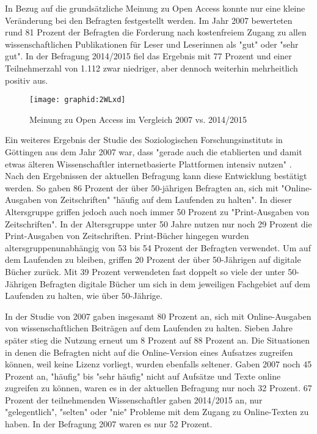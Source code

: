 In Bezug auf die grundsätzliche Meinung zu Open Access konnte nur eine kleine Veränderung bei den Befragten festgestellt werden. Im Jahr 2007 bewerteten rund 81 Prozent der Befragten die Forderung nach kostenfreiem Zugang zu allen wissenschaftlichen Publikationen für Leser und Leserinnen als "gut" oder "sehr gut". In der Befragung 2014/2015 fiel das Ergebnis mit 77 Prozent und einer Teilnehmerzahl von 1.112 zwar niedriger, aber dennoch weiterhin mehrheitlich positiv aus.

\begin{figure}[h!]
\texttt{[image: graphid:2WLxd]}
\caption{Meinung zu Open Access im Vergleich 2007 vs. 2014/2015}
\end{figure}

Ein weiteres Ergebnis der Studie des Soziologischen Forschungsinstituts in Göttingen aus dem Jahr 2007 war, dass "gerade auch die etablierten und damit etwas älteren Wissenschaftler internetbasierte Plattformen intensiv nutzen" \cite{Hanekop_2007}. Nach den Ergebnissen der aktuellen Befragung kann diese Entwicklung bestätigt werden. So gaben 86 Prozent der über 50-jährigen Befragten an, sich mit "Online-Ausgaben von Zeitschriften" "häufig auf dem Laufenden zu halten". In dieser Altersgruppe griffen jedoch auch noch immer 50 Prozent zu "Print-Ausgaben von Zeitschriften". In der Altersgruppe unter 50 Jahre nutzen nur noch 29 Prozent die Print-Ausgaben von Zeitschriften. Print-Bücher hingegen wurden altersgruppenunabhängig von 53 bis 54 Prozent der Befragten verwendet. Um auf dem Laufenden zu bleiben, griffen 20 Prozent der über 50-Jährigen auf digitale Bücher zurück. Mit 39 Prozent verwendeten fast doppelt so viele der unter 50-Jährigen Befragten digitale Bücher um sich in dem jeweiligen Fachgebiet auf dem Laufenden zu halten, wie über 50-Jährige.

In der Studie von 2007 gaben insgesamt 80 Prozent an, sich mit Online-Ausgaben von wissenschaftlichen Beiträgen auf dem Laufenden zu halten. Sieben Jahre später stieg die Nutzung erneut um 8 Prozent auf 88 Prozent an. Die Situationen in denen die Befragten nicht auf die Online-Version eines Aufsatzes zugreifen können, weil keine Lizenz vorliegt, wurden ebenfalls seltener. Gaben 2007 noch 45 Prozent an, "häufig" bis "sehr häufig" nicht auf Aufsätze und Texte online zugreifen zu können, waren es in der aktuellen Befragung nur noch 32 Prozent. 67 Prozent der teilnehmenden Wissenschaftler gaben 2014/2015 an, nur "gelegentlich", "selten" oder "nie" Probleme mit dem Zugang zu Online-Texten zu haben. In der Befragung 2007 waren es nur 52 Prozent.

